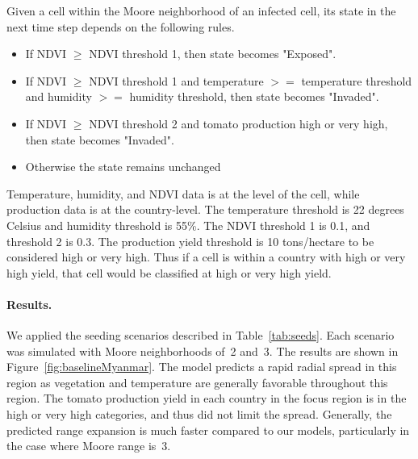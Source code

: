 \documentclass[10pt]{article}
\newcommand{\aacomment}[1]{({\color{magenta}AA: #1})}
\theoremstyle{definition}
\begin{document}
Given a cell within the Moore neighborhood of an infected cell, its state
in the next time step depends on the following rules.
\begin{itemize} 
\item If NDVI $\ge$ NDVI threshold 1, then state becomes "Exposed".
\item If NDVI $\ge$ NDVI threshold 1 and temperature $>=$ temperature threshold and humidity $>=$ humidity threshold, then state becomes "Invaded".
\item If NDVI $\ge$ NDVI threshold 2 and tomato production high or very high, then state becomes "Invaded".
\item Otherwise the state remains unchanged
\end{itemize}

Temperature, humidity, and NDVI data is at the level of the cell, while
production data is at the country-level. The temperature threshold is 22
degrees Celsius and humidity threshold is 55\%. The NDVI threshold 1 is
0.1, and threshold 2 is 0.3. The production yield threshold is 10
tons/hectare to be considered high or very high. Thus if a cell is within a
country with high or very high yield, that cell would be classified at high
or very high yield.
\paragraph{Results.}
We applied the seeding scenarios described in Table~\ref{tab:seeds}. Each
scenario was simulated with Moore neighborhoods of~2 and~3.  The results
are shown in Figure~\ref{fig:baselineMyanmar}.  The model predicts a rapid
radial spread in this region as vegetation and temperature are generally
favorable throughout this region.  The tomato production yield in each
country in the focus region is in the high or very high categories, and
thus did not limit the spread.  Generally, the predicted range expansion is
much faster compared to our models, particularly in the case where Moore
range is~3.

\end{document}
